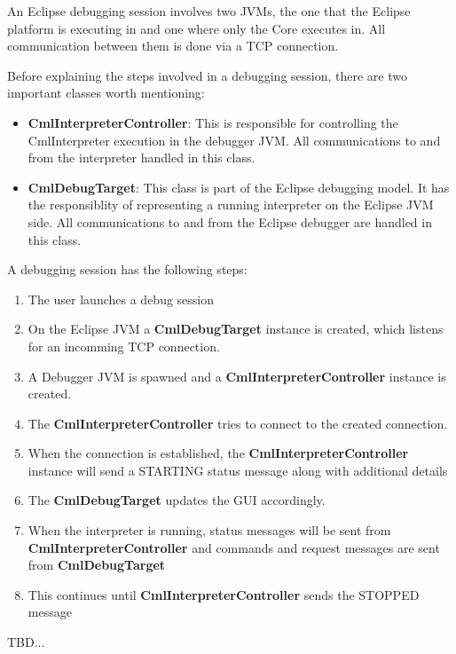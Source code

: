 \documentclass[a4paper, 10pt]{include/compassreport}   %
\begin{document}
An Eclipse debugging session involves two JVMs, the one that the Eclipse
platform is executing in and one where only the Core executes in. All
communication between them is done via a TCP connection. 

Before explaining the steps involved in a debugging session, there are
two important classes worth mentioning:

\begin{itemize}
\item \textbf{CmlInterpreterController}: This is responsible for
  controlling the CmlInterpreter execution in the debugger JVM.  All
  communications to and from the interpreter handled in this class.
  
\item \textbf{CmlDebugTarget}: This class is part of the Eclipse
  debugging model. It has the responsiblity of representing a running
  interpreter on the Eclipse JVM side. All communications to and from
  the Eclipse debugger are handled in this class.
\end{itemize}

A debugging session has the following steps:
\begin{enumerate}
\item The user launches a debug session
\item On the Eclipse JVM a \textbf{CmlDebugTarget} instance is
  created, which listens for an incomming TCP connection.
\item A Debugger JVM is spawned and a
  \textbf{CmlInterpreterController} instance is created.
\item The \textbf{CmlInterpreterController} tries to connect to the
  created connection.
\item When the connection is established, the
  \textbf{CmlInterpreterController} instance will send a STARTING status
  message along with additional details
\item The \textbf{CmlDebugTarget} updates the GUI accordingly.
\item When the interpreter is running, status messages will be sent from \textbf{CmlInterpreterController} and commands and request messages are sent from \textbf{CmlDebugTarget}
\item This continues until \textbf{CmlInterpreterController} sends the STOPPED message
\end{enumerate}

TBD...
\end{document}
